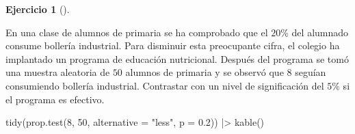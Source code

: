 \documentclass[
  spanish,
  a4paper,
]{scrreport}
\newenvironment{Shaded}{\begin{snugshade}}{\end{snugshade}}
\newcommand{\AttributeTok}[1]{\textcolor[rgb]{0.40,0.45,0.13}{#1}}
\newcommand{\DecValTok}[1]{\textcolor[rgb]{0.68,0.00,0.00}{#1}}
\newcommand{\FloatTok}[1]{\textcolor[rgb]{0.68,0.00,0.00}{#1}}
\newcommand{\FunctionTok}[1]{\textcolor[rgb]{0.28,0.35,0.67}{#1}}
\newcommand{\NormalTok}[1]{\textcolor[rgb]{0.00,0.23,0.31}{#1}}
\newcommand{\SpecialCharTok}[1]{\textcolor[rgb]{0.37,0.37,0.37}{#1}}
\newcommand{\StringTok}[1]{\textcolor[rgb]{0.13,0.47,0.30}{#1}}
\theoremstyle{definition}
\newtheorem{exercise}{Ejercicio}[chapter]
\theoremstyle{remark}
\begin{document}
\begin{exercise}[]\protect\hypertarget{exr-contraste-proporcion-bolleria-industrial}{}\label{exr-contraste-proporcion-bolleria-industrial}

En una clase de alumnos de primaria se ha comprobado que el \(20\)\% del
alumnado consume bollería industrial. Para disminuir esta preocupante
cifra, el colegio ha implantado un programa de educación nutricional.
Después del programa se tomó una muestra aleatoria de \(50\) alumnos de
primaria y se observó que 8 seguían consumiendo bollería industrial.
Contrastar con un nivel de significación del \(5\)\% si el programa es
efectivo.

\end{exercise}

\begin{tcolorbox}[enhanced jigsaw, arc=.35mm, bottomrule=.15mm, bottomtitle=1mm, breakable, colback=white, colbacktitle=quarto-callout-tip-color!10!white, colframe=quarto-callout-tip-color-frame, coltitle=black, left=2mm, leftrule=.75mm, opacityback=0, opacitybacktitle=0.6, rightrule=.15mm, title=\textcolor{quarto-callout-tip-color}{\faLightbulb}\hspace{0.5em}{Solución}, titlerule=0mm, toprule=.15mm, toptitle=1mm]

\begin{Shaded}
\begin{Highlighting}[]
\FunctionTok{tidy}\NormalTok{(}\FunctionTok{prop.test}\NormalTok{(}\DecValTok{8}\NormalTok{, }\DecValTok{50}\NormalTok{, }\AttributeTok{alternative =} \StringTok{"less"}\NormalTok{, }\AttributeTok{p =} \FloatTok{0.2}\NormalTok{)) }\SpecialCharTok{|\textgreater{}} 
    \FunctionTok{kable}\NormalTok{()}
\end{Highlighting}
\end{Shaded}


\end{tcolorbox}
\end{document}
